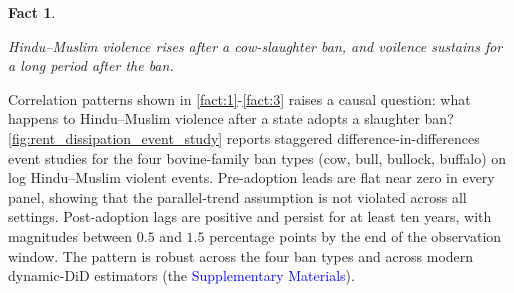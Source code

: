 \documentclass[11pt,twoside]{extarticle}
\newtheorem{fact}{Fact}
\newcommand{\suppmat}{\textcolor{blue}{Supplementary Materials}}
\begin{document}
\begin{fact}\label{fact:4}

Hindu--Muslim violence rises after a cow-slaughter ban, and voilence sustains for a long period after the ban. 
 
\end{fact}

Correlation patterns shown in \autoref{fact:1}-\autoref{fact:3} raises a causal question: what happens to Hindu--Muslim violence after a state adopts a slaughter ban? 
\autoref{fig:rent_dissipation_event_study} reports staggered difference-in-differences event studies for the four bovine-family ban types (cow, bull, bullock, buffalo) on log Hindu--Muslim violent events. 
Pre-adoption leads are flat near zero in every panel, showing that the parallel-trend assumption is not violated across all settings.
Post-adoption lags are positive and persist for at least ten years, with magnitudes between $0.5$ and $1.5$ percentage points by the end of the observation window. 
The pattern is robust across the four ban types and across modern dynamic-DiD estimators (the \suppmat). 
\end{document}
